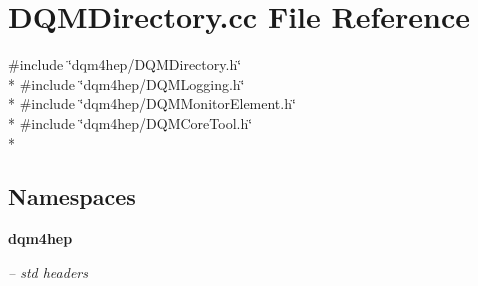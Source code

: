 \section{D\+Q\+M\+Directory.\+cc File Reference}
\label{DQMDirectory_8cc}
{\ttfamily \#include \char`\"{}dqm4hep/\+D\+Q\+M\+Directory.\+h\char`\"{}}\\*
{\ttfamily \#include \char`\"{}dqm4hep/\+D\+Q\+M\+Logging.\+h\char`\"{}}\\*
{\ttfamily \#include \char`\"{}dqm4hep/\+D\+Q\+M\+Monitor\+Element.\+h\char`\"{}}\\*
{\ttfamily \#include \char`\"{}dqm4hep/\+D\+Q\+M\+Core\+Tool.\+h\char`\"{}}\\*
\subsection*{Namespaces}
\begin{DoxyCompactItemize}
\item 
 {\bf dqm4hep}
\begin{DoxyCompactList}\small\item\em -- std headers \end{DoxyCompactList}\end{DoxyCompactItemize}

